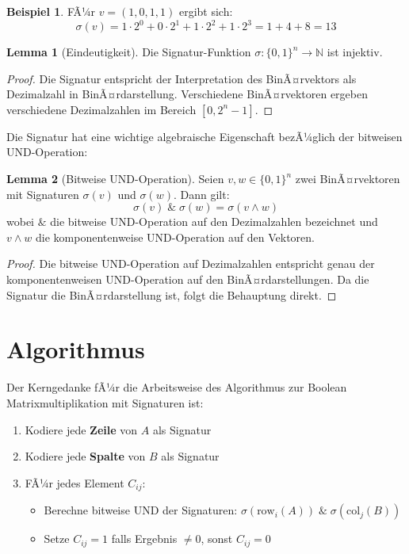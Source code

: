 ﻿\documentclass[a4paper,12pt]{article}
\theoremstyle{definition}
\newtheorem{beispiel}{Beispiel}
\newtheorem{lemma}{Lemma}
\begin{document}
\begin{beispiel}
	FÃ¼r $v = (1, 0, 1, 1)$ ergibt sich:
	\[
	\sigma(v) = 1 \cdot 2^0 + 0 \cdot 2^1 + 1 \cdot 2^2 + 1 \cdot 2^3 = 1 + 4 + 8 = 13
	\]
\end{beispiel}

\begin{lemma}[Eindeutigkeit]
	Die Signatur-Funktion $\sigma: \{0,1\}^n \to \mathbb{N}$ ist injektiv.
\end{lemma}

\begin{proof}
	Die Signatur entspricht der Interpretation des BinÃ¤rvektors als Dezimalzahl in BinÃ¤rdarstellung. Verschiedene BinÃ¤rvektoren ergeben verschiedene Dezimalzahlen im Bereich $[0, 2^n-1]$.
\end{proof}

Die Signatur hat eine wichtige algebraische Eigenschaft bezÃ¼glich der bitweisen UND-Operation:

\begin{lemma}[Bitweise UND-Operation]
	Seien $v, w \in \{0,1\}^n$ zwei BinÃ¤rvektoren mit Signaturen $\sigma(v)$ und $\sigma(w)$. Dann gilt:
	\[
	\sigma(v) \; \& \; \sigma(w) = \sigma(v \wedge w)
	\]
	wobei $\&$ die bitweise UND-Operation auf den Dezimalzahlen bezeichnet und $v \wedge w$ die komponentenweise UND-Operation auf den Vektoren.
\end{lemma}

\begin{proof}
	Die bitweise UND-Operation auf Dezimalzahlen entspricht genau der komponentenweisen UND-Operation auf den BinÃ¤rdarstellungen. Da die Signatur die BinÃ¤rdar\-stellung ist, folgt die Behauptung direkt.
\end{proof}

\section{Algorithmus}
Der Kerngedanke fÃ¼r die Arbeitsweise des Algorithmus zur Boolean Matrixmultiplikation mit Signaturen ist:

\begin{enumerate}
	\item Kodiere jede \textbf{Zeile} von $A$ als Signatur
	\item Kodiere jede \textbf{Spalte} von $B$ als Signatur
	\item FÃ¼r jedes Element $C_{ij}$:
	\begin{itemize}
		\item[-] Berechne bitweise UND der Signaturen: $\sigma(\text{row}_i(A)) \; \& \; \sigma(\text{col}_j(B))$
		\item[-] Setze $C_{ij} = 1$ falls Ergebnis $\neq 0$, sonst $C_{ij} = 0$
	\end{itemize}
\end{enumerate}
\end{document}
